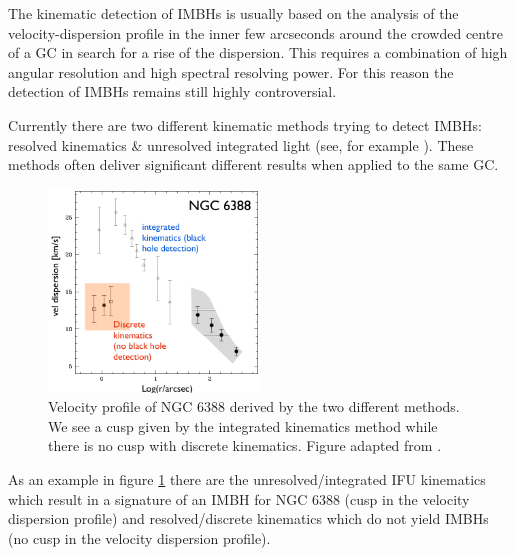 \par The kinematic detection of \acp{IMBH} is usually based on the analysis of the velocity-dispersion profile in the inner few arcseconds around the crowded centre of a \ac{GC} in search for a rise of the dispersion. This requires a combination of high angular resolution and high spectral resolving power. For this reason the detection of \acp{IMBH} remains still highly controversial. 
\par Currently there are two different kinematic methods trying to detect \acp{IMBH}: resolved kinematics \& unresolved integrated light (see, for example \citealt{2015MNRAS.453..365B}). These methods often deliver significant different results when applied to the same \ac{GC}.
\begin{figure}[htbp]
\centering
\includegraphics[width=0.5\textwidth]{Plots/Paolo_talk_plot.png}
\caption{Velocity profile of NGC 6388 derived by the two different methods. We see a cusp given by the integrated kinematics method while there is no cusp with discrete kinematics. Figure adapted from \citet{2013ApJ...769..107L} .}
\label{fig:NGC6388}
\end{figure}
 As an example in figure \ref{fig:NGC6388} there are the unresolved/integrated IFU kinematics which result in a signature of an \ac{IMBH} for NGC 6388 (cusp in the velocity dispersion profile) \citep{2011A&A...533A..36L} and resolved/discrete kinematics which do not yield \acp{IMBH} (no cusp in the velocity dispersion profile)\citet{2013ApJ...769..107L}. 

